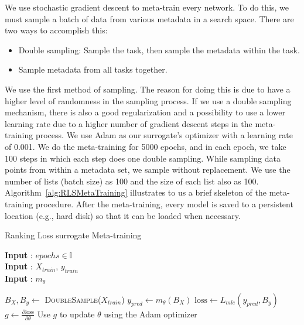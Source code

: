 \documentclass[12pt, twoside, ngerman]{report}
\begin{document}
We use stochastic gradient descent to meta-train every network.
To do this, we must sample a batch of data from various metadata in a search space.
There are two ways to accomplish this:
\begin{itemize}
\item Double sampling: Sample the task, then sample the metadata within the task.
\item Sample metadata from all tasks together.
\end{itemize}

We use the first method of sampling.
The reason for doing this is due to have a higher level of randomness in the sampling process. If we use a double sampling mechanism, there is also a good regularization and a possibility to use a lower learning rate due to a higher number of gradient descent steps in the meta-training process.
We use Adam as our surrogate's optimizer with a learning rate of 0.001.
We do the meta-training for 5000 epochs, and in each epoch, we take 100 steps in which each step does one double sampling.
While sampling data points from within a metadata set, we sample without replacement.
We use the number of lists (batch size) as 100 and the size of each list also as 100.
Algorithm~\ref{alg:RLSMetaTraining} illustrates to us a brief skeleton of the meta-training procedure.
After the meta-training, every model is saved to a persistent location (e.g., hard disk) so that it can be loaded when necessary.

\begin{algorithm}[h]
\caption{Ranking Loss surrogate Meta-training}
\label{alg:RLSMetaTraining}
\hspace*{\algorithmicindent} \textbf{Input} : $epochs \in \mathbb{I}$ \\
 \hspace*{\algorithmicindent} \textbf{Input} : $X_{train}$,  $y_{train}$   \\
\hspace*{\algorithmicindent} \textbf{Input} : $m_{\theta}$ 
\begin{algorithmic}[1]
                \State $B_{X}, B_{y} \gets$ \textsc{DoubleSample}($X_{train}$) 
                \State $y_{pred} \gets m_{\theta}(B_{X})$
                \State $\textrm{loss} \gets L_{mle}(y_{pred},  B_{y}) $
                \State $g \gets \frac{\partial \textrm{loss}}{\partial \theta}$ 
                \State Use $g$ to update $\theta$ using the Adam optimizer
            \EndFor
    \EndFor
\EndProcedure
\end{algorithmic}
\end{algorithm}
\end{document}
